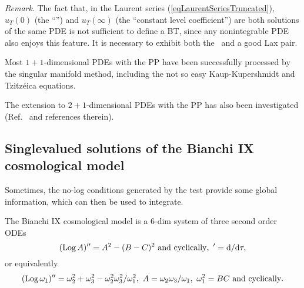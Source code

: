 \documentclass[10pt]{article}
\begin{document}
\textit{Remark}.
The fact that,
in the Laurent series (\ref{eqLaurentSeriesTruncated}),
$u_T(0)$ (the ``\LHS'') and $u_T(\infty)$ (the ``constant level coefficient'')
are both solutions of the same PDE is not sufficient to define a BT,
since any nonintegrable 
PDE also enjoys this feature.
It is necessary to exhibit both the \formerDT\ and a good Lax pair.

Most $1+1$-dimensional PDEs with the PP have been successfully processed
by the singular manifold method,
including the not so easy 
Kaup-Kupershmidt \cite{MC1998} 
and Tzitz\'eica \cite{CMG1999} 
equations.

The extension to $2+1$-dimensional PDEs with the PP 
has also been investigated (Ref.~\cite{E2001} and references therein).

\subsection{Singlevalued solutions of the Bianchi IX cosmological model}
\label{sectionBianchiIX}

Sometimes, the no-log conditions generated by the test
provide some global information, which can then be used to integrate.

The Bianchi IX cosmological model 
is a 6-dim system of three second order ODEs
\begin{equation}
(\mathop{\rm Log}\nolimits A)'' = A^2 - (B-C)^2
\hbox{ and cyclically},\
'=\hbox{d} / \hbox{d} \tau,
\label{eqBianchi1}
\end{equation}
or equivalently
\begin{equation}
(\mathop{\rm Log}\nolimits \omega_1)''
= \omega_2^2 + \omega_3^2 - \omega_2^2 \omega_3^2 / \omega_1^2,\
A= \omega_2 \omega_3 / \omega_1,\
\omega_1^2=B C
\hbox{ and cyclically}.
\end{equation}
\end{document}
